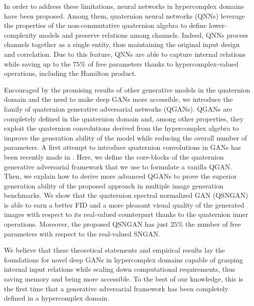 \documentclass[graybox]{svmult}
\begin{document}
In order to address these limitations, neural networks in hypercomplex domains have been proposed. Among them, quaternion neural networks (QNNs) leverage the properties of the non-commutative quaternion algebra to define lower-complexity models and preserve relations among channels. Indeed, QNNs process channels together as a single entity, thus maintaining the original input design and correlation. Due to this feature, QNNs are able to capture internal relations while saving up to the $75\%$ of free parameters thanks to hypercomplex-valued operations, including the Hamilton product.

Encouraged by the promising results of other generative models in the quaternion domain \cite{GrassucciICASSP2021, Grassucci2021Entropy} and the need to make deep GANs more accessible, we introduce the family of quaternion generative adversarial networks (QGANs). QGANs are completely defined in the quaternion domain and, among other properties, they exploit the quaternion convolutions derived from the hypercomplex algebra \cite{ParcolletAIR2019, ParcolletICLR2019, GaudetIJCNN2018, ComminielloICASSP2019a} to improve the generation ability of the model while reducing the overall number of parameters. A first attempt to introduce quaternion convolutions in GANs has been recently made in \cite{Qgan2021Sfikas}. Here, we define the core-blocks of the quaternion generative adversarial framework that we use to formulate a vanilla QGAN. Then, we explain how to derive more advanced QGANs to prove the superior generation ability of the proposed approach in multiple image generation benchmarks. We show that the quaternion spectral normalized GAN (QSNGAN) is able to earn a better FID and a more pleasant visual quality of the generated images with respect to its real-valued counterpart thanks to the quaternion inner operations. Moreover, the proposed QSNGAN has just $25\%$ the number of free parameters with respect to the real-valued SNGAN.

We believe that these theoretical statements and empirical results lay the foundations for novel deep GANs in hypercomplex domains capable of grasping internal input relations while scaling down computational requirements, thus saving memory and being more accessible. To the best of our knowledge, this is the first time that a generative adversarial framework has been completely defined in a hypercomplex domain.
\end{document}
